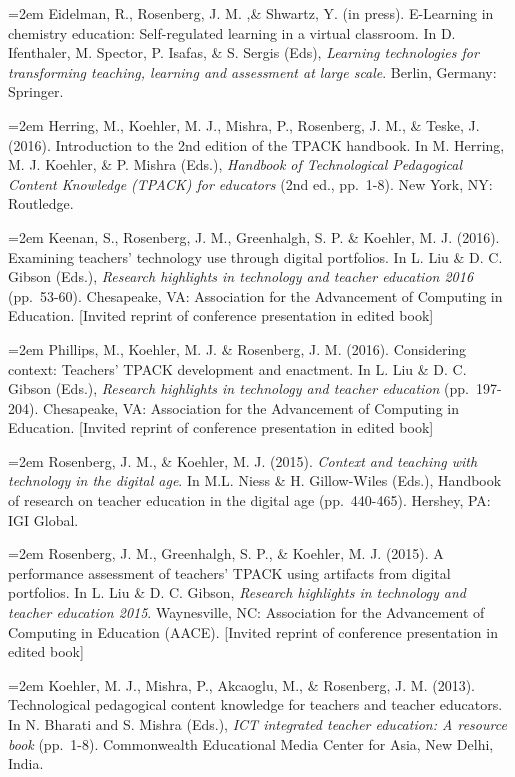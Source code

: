 \documentclass[]{article}
\begin{document}
\hangindent=2em Eidelman, R., Rosenberg, J. M. ,\& Shwartz, Y. (in
press). E-Learning in chemistry education: Self-regulated learning in a
virtual classroom. In D. Ifenthaler, M. Spector, P. Isafas, \& S. Sergis
(Eds), \emph{Learning technologies for transforming teaching, learning
and assessment at large scale}. Berlin, Germany: Springer.

\hangindent=2em Herring, M., Koehler, M. J., Mishra, P., Rosenberg, J.
M., \& Teske, J. (2016). Introduction to the 2nd edition of the TPACK
handbook. In M. Herring, M. J. Koehler, \& P. Mishra (Eds.),
\emph{Handbook of Technological Pedagogical Content Knowledge (TPACK)
for educators} (2nd ed., pp.~1-8). New York, NY: Routledge.

\hangindent=2em Keenan, S., Rosenberg, J. M., Greenhalgh, S. P. \&
Koehler, M. J. (2016). Examining teachers' technology use through
digital portfolios. In L. Liu \& D. C. Gibson (Eds.), \emph{Research
highlights in technology and teacher education 2016} (pp.~53-60).
Chesapeake, VA: Association for the Advancement of Computing in
Education. {[}Invited reprint of conference presentation in edited
book{]}

\hangindent=2em Phillips, M., Koehler, M. J. \& Rosenberg, J. M. (2016).
Considering context: Teachers' TPACK development and enactment. In L.
Liu \& D. C. Gibson (Eds.), \emph{Research highlights in technology and
teacher education} (pp.~197-204). Chesapeake, VA: Association for the
Advancement of Computing in Education. {[}Invited reprint of conference
presentation in edited book{]}

\hangindent=2em Rosenberg, J. M., \& Koehler, M. J. (2015).
\emph{Context and teaching with technology in the digital age}. In M.L.
Niess \& H. Gillow-Wiles (Eds.), Handbook of research on teacher
education in the digital age (pp.~440-465). Hershey, PA: IGI Global.

\hangindent=2em Rosenberg, J. M., Greenhalgh, S. P., \& Koehler, M. J.
(2015). A performance assessment of teachers' TPACK using artifacts from
digital portfolios. In L. Liu \& D. C. Gibson, \emph{Research highlights
in technology and teacher education 2015}. Waynesville, NC: Association
for the Advancement of Computing in Education (AACE). {[}Invited reprint
of conference presentation in edited book{]}

\hangindent=2em Koehler, M. J., Mishra, P., Akcaoglu, M., \& Rosenberg,
J. M. (2013). Technological pedagogical content knowledge for teachers
and teacher educators. In N. Bharati and S. Mishra (Eds.), \emph{ICT
integrated teacher education: A resource book} (pp.~1-8). Commonwealth
Educational Media Center for Asia, New Delhi, India.
\end{document}
